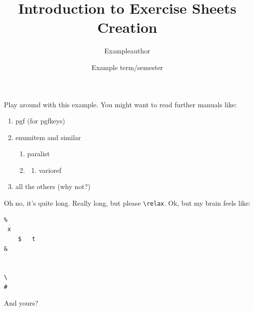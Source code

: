 \ifbeamer{\documentclass{beamer}}{\documentclass[a5paper]{article}}
\author{Exampleauthor}
\date{Example term/semester}
\title{Introduction to Exercise Sheets Creation}
\begin{document}
\begin{sheet}[note={Learn how to create nice exercise sheets.},
  date={Novanuar 42, -2022},title={First Sheet}]


  \begin{exercise}[points={many, many},firstline={Read the manual.}]
  \end{exercise}

  \begin{exercise}[points={sum},firstline={After you read the manual:}]
    Play around with this example. You might want to read further manuals like:
    \begin{enumerate}
      \item{}pgf (for pgfkeys)
      \item enumitem and similar 
      \begin{enumerate}
        \item paralist \thesubex
        \item
          \begin{enumerate}
            \item varioref
          \end{enumerate}
      \end{enumerate}
      \item all the others  (why not?)
      \label{subex:man2}
    \end{enumerate}
  \end{exercise}
\end{sheet}

\begingroup
{}

\begin{sheet}[date={Novanuar 35, -2022}]
  \begin{exercise}[points={many, many},
    firstline={Read the manual.}]
  \end{exercise}
  \begin{solution}
    Oh no, it's quite long.
    \newframe
    Really long, but please \verb|\relax|.
    Ok, but my brain feels like:
    \begin{verbatim}
%
 x
	$	t
&


\
#
    \end{verbatim}
    And yours?
  \end{solution}
\end{sheet}
\end{document}

